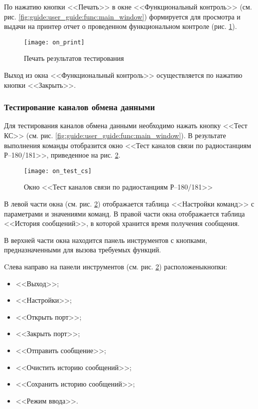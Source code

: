 По нажатию кнопки <<Печать>> в окне <<Функциональный контроль>>
(см. рис. \ref{fig:guide:user_guide:func:main_window}) формируется для просмотра и выдачи на принтер отчет
о проведенном функциональном контроле (рис. \ref{fig:guide:user_guide:func:on_print}).
\begin{figure}
	\centering
	\texttt{[image: on\_print]}
	\caption{Печать результатов тестирования}
	\label{fig:guide:user_guide:func:on_print}
\end{figure}

Выход из окна <<Функциональный контроль>> осуществляется по нажатию кнопки <<Закрыть>>.

\subsubsection{Тестирование каналов обмена данными}
\label{sub:guide:user_guide:radio}

Для тестирования каналов обмена данными необходимо нажать кнопку <<Тест КС>> (см. рис.
\ref{fig:guide:user_guide:func:main_window}).
В результате выполнения команды отобразится окно <<Тест каналов связи по радиостанциям Р–180/181>>, приведенное на рис.
\ref{fig:guide:user_guide:radio:on_test_cs}.
\begin{figure}[htb]
	\centering
	\texttt{[image: on\_test\_cs]}
	\caption{Окно <<Тест каналов связи по радиостанциям Р–180/181>>}
	\label{fig:guide:user_guide:radio:on_test_cs}
\end{figure}
В левой части окна (см. рис. \ref{fig:guide:user_guide:radio:on_test_cs}) отображается таблица <<Настройки команд>> с параметрами и значениями команд.
В правой части окна отображается таблица <<История сообщений>>, в которой хранится время получения сообщения.

В верхней части окна находится панель инструментов с кнопками, предназначенными для вызова требуемых функций.

Cлева направо на панели инструментов (см. рис. \ref{fig:guide:user_guide:radio:on_test_cs}) расположены\break кнопки:
\begin{itemize}
	\item <<Выход>>;
	\item <<Настройки>>;
	\item <<Открыть порт>>;
	\item <<Закрыть порт>>;
	\item <<Отправить сообщение>>;
	\item <<Очистить историю сообщений>>;
	\item <<Сохранить историю сообщений>>;
	\item <<Режим ввода>>.
\end{itemize}

